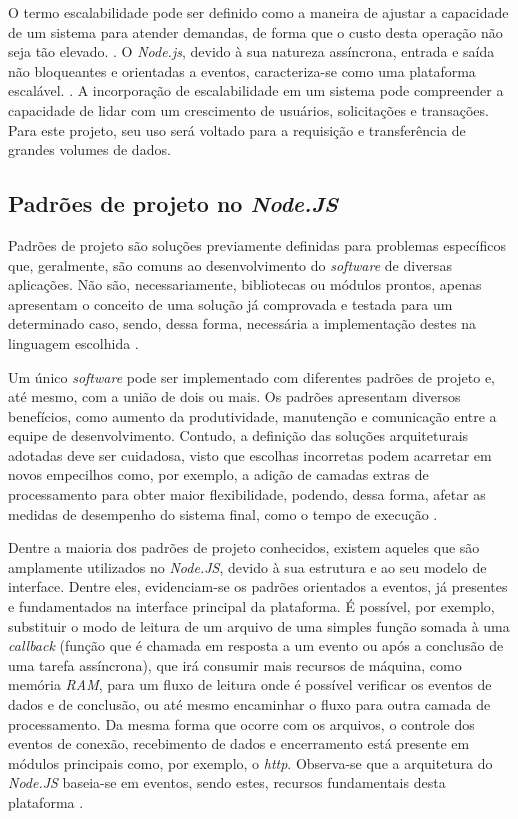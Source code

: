 \documentclass[12pt]{article}
\begin{document}
O termo escalabilidade pode ser definido como a maneira de ajustar a
capacidade de um sistema para atender demandas, de forma que o custo desta
operação não seja tão elevado. \cite[p. 3]{EJSMONT}. O \textit{Node.js}, devido à sua natureza
assíncrona, entrada e saída não bloqueantes e orientadas a eventos, caracteriza-se como
uma plataforma escalável. \cite[p. 2]{SCALABILITY}. A incorporação de escalabilidade
em um sistema pode compreender a capacidade de lidar com um crescimento de usuários, solicitações
e transações. Para este projeto, seu uso será voltado para a requisição e transferência de grandes volumes de dados.


\subsection{Padrões de projeto no \textit{Node.JS}}

Padrões de projeto são soluções previamente definidas para problemas específicos que, geralmente,
são comuns ao desenvolvimento do \textit{software} de diversas aplicações. Não são, necessariamente, 
bibliotecas ou módulos prontos, apenas apresentam o conceito de uma solução já comprovada e testada para um 
determinado caso, sendo, dessa forma, necessária a implementação destes na 
linguagem escolhida \cite[p. 13]{DIOGORESENDE}.

Um único \textit{software} pode ser implementado com diferentes padrões de projeto e, até mesmo, com a união
de dois ou mais. Os padrões apresentam diversos benefícios, como aumento da produtividade, manutenção e comunicação
entre a equipe de desenvolvimento. Contudo, a definição das soluções arquiteturais adotadas deve ser 
cuidadosa, visto que escolhas incorretas podem acarretar em novos empecilhos como, por exemplo, a adição de
camadas extras de processamento para obter maior flexibilidade, podendo, dessa forma, 
afetar as medidas de desempenho do sistema final, como o tempo de execução \cite[p. 13 - p. 14]{DIOGORESENDE}.

Dentre a maioria dos padrões de projeto conhecidos, existem aqueles que são amplamente utilizados no 
\textit{Node.JS}, devido à sua estrutura e ao seu modelo de interface. Dentre eles, evidenciam-se
os padrões orientados a eventos, já presentes e fundamentados na interface principal 
da plataforma. É possível, por exemplo, substituir o modo de leitura de um arquivo de 
uma simples função somada à uma \textit{callback} (função que é chamada em resposta a um evento ou após a conclusão de uma tarefa assíncrona), que irá consumir mais recursos de máquina, como memória \textit{RAM}, 
para um fluxo de leitura onde é possível verificar os eventos de dados e de conclusão, 
ou até mesmo encaminhar o fluxo para outra camada de processamento. Da mesma forma que ocorre com os 
arquivos, o controle dos eventos 
de conexão, recebimento de dados e encerramento está presente em módulos principais como, por exemplo, 
o \textit{http}. Observa-se que a arquitetura do \textit{Node.JS} baseia-se em eventos, sendo estes,
recursos fundamentais desta plataforma \cite[p. 15]{DIOGORESENDE}.
\end{document}
